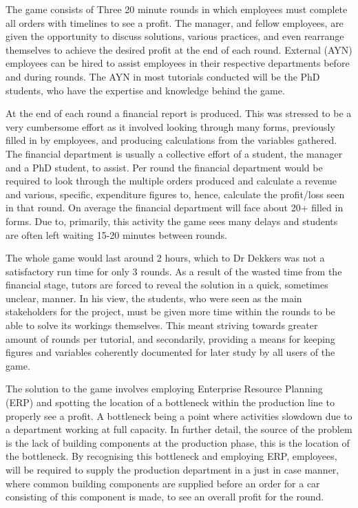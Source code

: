 \documentclass{l3proj}
\begin{document}
The game consists of Three 20 minute rounds in which employees must complete all orders with timelines to see a profit. The manager, and fellow employees, are given the opportunity to discuss solutions, various practices, and even rearrange themselves to achieve the desired profit at the end of each round. External (AYN) employees can be hired to assist employees in their respective departments before and during rounds. The AYN in most tutorials conducted will be the PhD students, who have the expertise and knowledge behind the game.

At the end of each round a financial report is produced. This was stressed to be a very cumbersome effort as it involved looking through many forms, previously filled in by employees, and producing calculations from the variables gathered. The financial department is usually a collective effort of a student, the manager and a PhD student, to assist. Per round the financial department would be required to look through the multiple orders produced and calculate a revenue and various, specific, expenditure figures to, hence, calculate the profit/loss seen in that round. On average the financial department will face about 20+ filled in forms. Due to, primarily, this activity the game sees many delays and students are often left waiting 15-20 minutes between rounds.

The whole game would last around 2 hours, which to Dr Dekkers was not a satisfactory run time for only 3 rounds. As a result of the wasted time from the financial stage, tutors are forced to reveal the solution in a quick, sometimes unclear, manner. In his view, the students, who were seen as the main stakeholders for the project, must be given more time within the rounds to be able to solve its workings themselves. This meant striving towards greater amount of rounds per tutorial, and secondarily, providing a means for keeping figures and variables coherently documented for later study by all users of the game.

The solution to the game involves employing Enterprise Resource Planning (ERP) and spotting the location of a bottleneck within the production line to properly see a profit. A bottleneck being a point where activities slowdown due to a department working at full capacity. In further detail, the source of the problem is the lack of building components at the production phase, this is the location of the bottleneck. By recognising this bottleneck and employing ERP, employees, will be required to supply the production department in a just in case manner, where common building components are supplied before an order for a car consisting of this component is made, to see an overall profit for the round.
\end{document}
